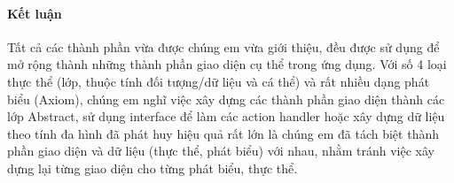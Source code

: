 \paragraph{Kết luận} Tất cả các thành phần vừa được chúng em vừa giới thiệu, đều được sử dụng để mở rộng thành những thành phần giao diện cụ thể trong ứng dụng. Với số 4 loại thực thể (lớp, thuộc tính đối tượng/dữ liệu và cá thể) và rất nhiều dạng phát biểu (Axiom), chúng em nghĩ việc xây dựng các thành phần giao diện thành các lớp Abstract, sử dụng interface để làm các action handler hoặc xây dựng dữ liệu theo tính đa hình đã phát huy hiệu quả rất lớn là chúng em đã tách biệt thành phần giao diện và dữ liệu (thực thể, phát biểu) với nhau, nhằm tránh việc xây dựng lại từng giao diện cho từng phát biểu, thực thể.

